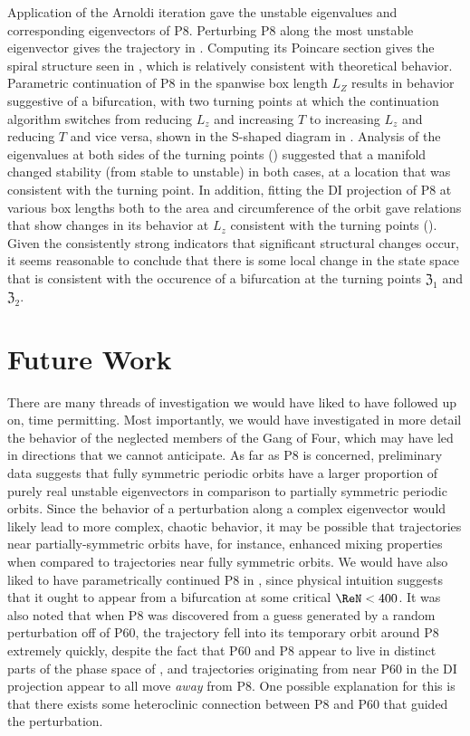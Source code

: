 Application of the Arnoldi iteration gave the unstable eigenvalues and corresponding eigenvectors of P8. Perturbing P8 along the most unstable eigenvector gives the trajectory in . Computing its Poincare section gives the spiral structure seen in , which is relatively consistent with theoretical behavior. Parametric continuation of P8 in the spanwise box length $L_Z$ results in behavior suggestive of a bifurcation, with two turning points at which the continuation algorithm switches from reducing $L_z$ and increasing $T$ to increasing $L_z$ and reducing $T$ and vice versa, shown in the S-shaped diagram in . Analysis of the eigenvalues at both sides of the turning points () suggested that a manifold changed stability (from stable to unstable) in both cases, at a location that was consistent with the turning point.  In addition, fitting the DI projection of P8 at various box lengths both to the area and circumference of the orbit gave relations that show changes in its behavior at $L_z$ consistent with the turning points (). Given the consistently strong indicators that significant structural changes occur, it seems reasonable to conclude that there is some local change in the state space that is consistent with the occurence of a bifurcation at the turning points $\mathfrak{Z}_1$ and $\mathfrak{Z}_2$.\\


\section{Future Work}

There are many threads of investigation we would have liked to have followed up on, time permitting. Most importantly, we would have investigated in more detail the behavior of the neglected members of the Gang of Four, which may have led in directions that we cannot anticipate. As far as P8 is concerned, preliminary data suggests that fully symmetric periodic orbits have a larger proportion of purely real unstable eigenvectors in comparison to partially symmetric periodic orbits. Since the behavior of a perturbation along a complex eigenvector would likely lead to more complex, chaotic behavior, it may be possible that trajectories near partially-symmetric orbits have, for instance, enhanced mixing properties when compared to trajectories near fully symmetric orbits. We would have also liked to have parametrically continued P8 in \ReN, since physical intuition suggests that it ought to appear from a bifurcation at some critical $\ReN < 400$.  It was also noted that when P8 was discovered from a guess generated by a random perturbation off of P60, the trajectory fell into its temporary orbit around P8 extremely quickly, despite the fact that P60 and P8 appear to live in distinct parts of the phase space of , and trajectories originating from near P60 in the DI projection appear to all move \emph{away} from P8. One possible explanation for this is that there exists some heteroclinic connection between P8 and P60 that guided the perturbation.  